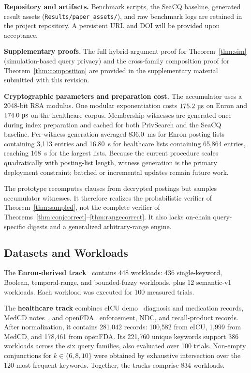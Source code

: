 \documentclass[journal]{IEEEtran}
\theoremstyle{tight}
\theoremstyle{remark}
\theoremstyle{plain}
\begin{document}
\textbf{Repository and artifacts.}
Benchmark scripts, the SeaCQ baseline, generated result assets (\texttt{Results/paper\_assets/}), and raw benchmark logs are retained in the project repository. A persistent URL and DOI will be provided upon acceptance.

\textbf{Supplementary proofs.}
The full hybrid-argument proof for Theorem~\ref{thm:sim} (simulation-based query privacy) and the cross-family composition proof for Theorem~\ref{thm:composition} are provided in the supplementary material submitted with this revision.

\textbf{Cryptographic parameters and preparation cost.}
The accumulator uses a 2048-bit RSA modulus. One modular exponentiation costs \(175.2~\text{\textmu s}\) on Enron and \(174.0~\text{\textmu s}\) on the healthcare corpus. Membership witnesses are generated once during index preparation and cached for both PrivSearch and the SeaCQ baseline. Per-witness generation averaged 836.0~ms for Enron posting lists containing 3{,}113 entries and 16.80~s for healthcare lists containing 65{,}864 entries, reaching 168~s for the largest lists. Because the current procedure scales quadratically with posting-list length, witness generation is the primary deployment constraint; batched or incremental updates remain future work.

The prototype recomputes clauses from decrypted postings but samples accumulator witnesses. It therefore realizes the probabilistic verifier of Theorem~\ref{thm:sampled}, not the complete verifier of Theorems~\ref{thm:conjcorrect}--\ref{thm:rangecorrect}. It also lacks on-chain query-specific digests and a generalized arbitrary-range engine.

\subsection{Datasets and Workloads}
\label{4B}

The \textbf{Enron-derived track}~\cite{Klimt2004} contains 448 workloads: 436 single-keyword, Boolean, temporal-range, and bounded-fuzzy workloads, plus 12 semantic-v1 workloads. Each workload was executed for 100 measured trials.

The \textbf{healthcare track} combines eICU demo~\cite{Pollard2018eICU} diagnosis and medication records, MedCD notes~\cite{TigerResearch2025MedCD}, and openFDA~\cite{openFDA} enforcement, NDC, and recall-product records. After normalization, it contains 281{,}042 records: 100{,}582 from eICU, 1{,}999 from MedCD, and 178{,}461 from openFDA. Its 221{,}760 unique keywords support 386 workloads across the six query families, also evaluated over 100 trials. Non-empty conjunctions for \(k\in\{6,8,10\}\) were obtained by exhaustive intersection over the 120 most frequent keywords. Together, the tracks comprise 834 workloads.
\end{document}
